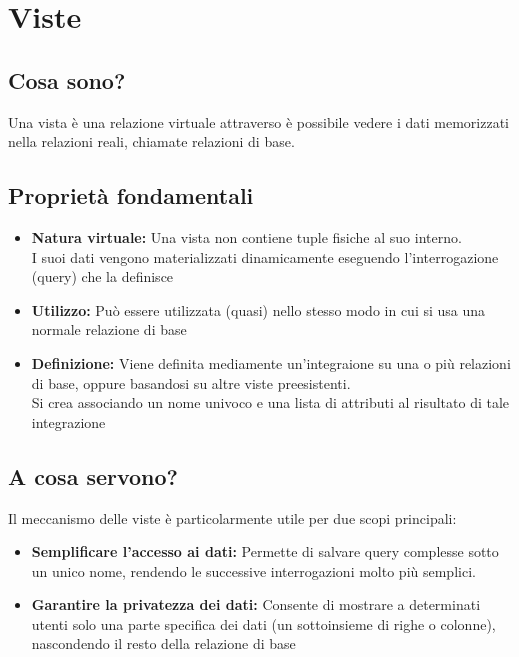 \chapter{Viste}
\section{Cosa sono?}
Una vista è una relazione virtuale attraverso è possibile vedere i dati memorizzati nella relazioni reali, chiamate relazioni di base.

\section{Proprietà fondamentali}
\begin{itemize}
    \item \textbf{Natura virtuale:} Una vista non contiene tuple fisiche al suo interno.\\
    I suoi dati vengono materializzati dinamicamente eseguendo l'interrogazione (query) che la definisce
    \item \textbf{Utilizzo:} Può essere utilizzata (quasi) nello stesso modo in cui si usa una normale relazione di base
    \item \textbf{Definizione:} Viene definita mediamente un'integraione su una o più relazioni di base, oppure basandosi su altre viste preesistenti.\\
    Si crea associando un nome univoco e una lista di attributi al risultato di tale integrazione
\end{itemize}

\section{A cosa servono?}
Il meccanismo delle viste è particolarmente utile per due scopi principali:
\begin{itemize}
    \item \textbf{Semplificare l'accesso ai dati:} Permette di salvare query complesse sotto un unico nome, rendendo le successive interrogazioni molto più semplici.
    \item \textbf{Garantire la privatezza dei dati:} Consente di mostrare a determinati utenti solo una parte specifica dei dati (un sottoinsieme di righe o colonne), nascondendo il resto della relazione di base
\end{itemize}

